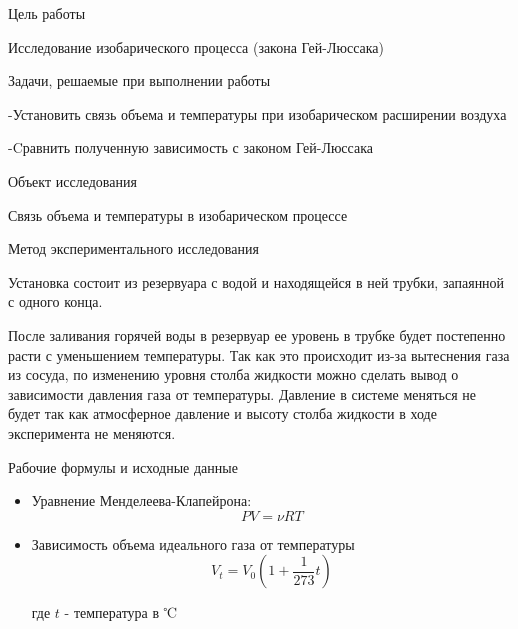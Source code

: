 \documentclass[12pt]{article}
\begin{document}

    \begin{point}{Цель работы}
        \par Исследование изобарического процесса (закона Гей-Люссака)

    \end{point}

    \begin{point}{Задачи, решаемые при выполнении работы}
        \par -Установить связь объема и температуры при изобарическом расширении воздуха
        \par -Cравнить полученную зависимость с законом Гей-Люссака
    \end{point}

    \begin{point}{Объект исследования}
        \par Связь объема и температуры в изобарическом процессе
    \end{point}

    \begin{point}{Метод экспериментального исследования}
        \par Установка состоит из резервуара с водой и находящейся в ней трубки, запаянной с одного конца.
        \par После заливания горячей воды в резервуар ее уровень в трубке будет постепенно расти с уменьшением температуры. Так как это происходит из-за вытеснения газа из сосуда, по изменению уровня столба жидкости можно сделать вывод о зависимости давления газа от температуры. Давление в системе меняться не будет так как атмосферное давление и высоту столба жидкости в ходе эксперимента не меняются.
    \end{point}

    \begin{point}{Рабочие формулы и исходные данные}
        \begin{itemize}
            \item Уравнение Менделеева-Клапейрона:
            \begin{equation}
                PV = \nu R T
            \end{equation}
            \item Зависимость объема идеального газа от температуры
            \begin{equation}
                V_{t} = V_{0} \left( 1 + \frac{1}{273} t \right)
            \end{equation}
            \par где $t$ - температура в ℃
            \end{itemize}
    \end{point}
\end{document}
